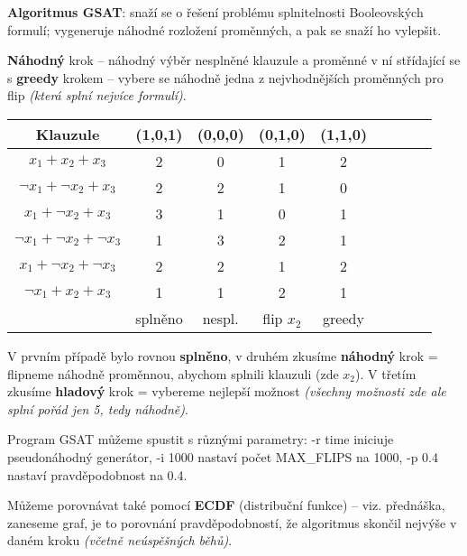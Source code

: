 \textbf{Algoritmus GSAT}: snaží se o řešení problému splnitelnosti Booleovských formulí; vygeneruje náhodné rozložení proměnných, a pak se snaží ho vylepšit.

\vspace{4pt}
\noindent \textbf{Náhodný} krok -- náhodný výběr nesplněné klauzule a proměnné v ní střídající se s \textbf{greedy} krokem -- vybere se náhodně jedna z nejvhodnějších proměnných pro flip \textit{(která splní nejvíce formulí)}.

\begin{table}[H]
    \centering
    \begin{tabular}{c|c|c|c|c|c|c|c|c}
         Klauzule & (1,0,1) & (0,0,0) & (0,1,0) & (1,1,0) \\
           \hline
          $x_1 + x_2 + x_3$ & 2 & 0 & 1 & 2 \\
           \hline
          $\neg x_1 + \neg x_2 + x_3$ & 2 & 2 & 1 & 0 \\
           \hline
          $x_1 + \neg x_2 + x_3$ & 3 & 1 & 0 & 1 \\
           \hline
          $\neg x_1 + \neg x_2 + \neg x_3$ & 1 & 3 & 2 & 1 \\
          \hline
          $x_1 + \neg x_2 + \neg x_3$ & 2 & 2 & 1 & 2 \\
           \hline
          $\neg x_1 + x_2 + x_3$ & 1 & 1 & 2 & 1 \\
          \hline
          & splněno & nespl. & flip $x_2$ & greedy
    \end{tabular}
\end{table}

\noindent V prvním případě bylo rovnou \textbf{splněno}, v druhém zkusíme \textbf{náhodný} krok = flipneme náhodně proměnnou, abychom splnili klauzuli (zde $x_2$). V třetím zkusíme \textbf{hladový} krok = vybereme nejlepší možnost \textit{(všechny možnosti zde ale splní pořád jen 5, tedy náhodně)}.

Program GSAT můžeme spustit s různými parametry: -r time iniciuje pseudo\-náhodný generátor, -i 1000 nastaví počet MAX\_FLIPS na 1000, -p 0.4 nastaví pravděpodobnost na 0.4.

\vspace{4pt}
\noindent Můžeme porovnávat také pomocí \textbf{ECDF} (distribuční funkce) -- viz. přednáška, zaneseme graf, je to porovnání pravděpodobností, že algoritmus skončil nejvýše v daném kroku \textit{(včetně neúspěšných běhů)}.
